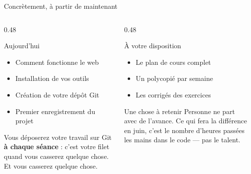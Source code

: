 \documentclass[aspectratio=169,11pt]{beamer}
\begin{document}
\begin{frame}{Concrètement, à partir de maintenant}
  \vspace{0.2cm}
  \begin{columns}[T]
    \begin{column}{0.48\textwidth}
      \begin{block}{Aujourd'hui}
        \begin{itemize}
          \item Comment fonctionne le web
          \item Installation de vos outils
          \item Création de votre dépôt Git
          \item Premier enregistrement du projet
        \end{itemize}
        \smallskip
        {\small Vous déposerez votre travail sur Git \textbf{à chaque séance} : c'est votre filet quand vous casserez quelque chose. Et vous casserez quelque chose.}
      \end{block}
    \end{column}
    \begin{column}{0.48\textwidth}
      \begin{block}{À votre disposition}
        \begin{itemize}
          \item Le plan de cours complet
          \item Un polycopié par semaine
          \item Les corrigés des exercices
        \end{itemize}
      \end{block}
      \vspace{0.2cm}
      \begin{exampleblock}{Une chose à retenir}
        \small Personne ne part avec de l'avance. Ce qui fera la différence en juin, c'est le nombre d'heures passées les mains dans le code --- pas le talent.
      \end{exampleblock}
    \end{column}
  \end{columns}
\end{frame}

{
\begin{frame}[plain]
\end{frame}
}
\end{document}
